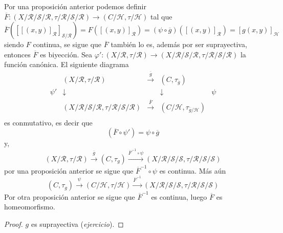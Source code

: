 \documentclass[12pt]{report}
\theoremstyle{largebreak}
\newcommand\cf[3]{\ensuremath{#1:#2\rightarrow#3}}
\begin{document}
\begin{exa}
        Por una proposición anterior podemos definir $\cf{\overline{F}}{(X/\mathcal{R}/\mathcal{S}/\mathcal{R},\tau/\mathcal{R}/\mathcal{S}/\mathcal{R})}{(C/\mathcal{H},\tau/\mathcal{H})}$ tal que
        \begin{equation*}
            \overline{F}\left(\left[\left[(x,y) \right]_{\mathcal{R}} \right]_{\mathcal{S}/\mathcal{R}} \right)=F\left([(x,y)]_{\mathcal{R}}\right)=(\psi\circ\overline{g})([(x,y)]_{\mathcal{R}})=[g(x,y)]_{\mathcal{H}}
        \end{equation*}
        siendo $F$ continua, se sigue que $\overline{F}$ también lo es, además por ser suprayectiva, entonces $\overline{F}$ es biyección. Sea $\cf{\varphi'}{(X/\mathcal{R},\tau/\mathcal{R})}{(X/\mathcal{R}/\mathcal{S}/\mathcal{R},\tau/\mathcal{R}/\mathcal{S}/\mathcal{R})}$ la función canónica. El siguiente diagrama
        \begin{equation*}
            \begin{array}{lcccr}
                & (X/\mathcal{R},\tau/\mathcal{R})& \overset{\overline{g}}{\longrightarrow} & (C,\tau_{\overline{g}}) & \\
                \psi' & \downarrow & & \downarrow & \psi\\
                & (X/\mathcal{R}/\mathcal{S}/\mathcal{R},\tau/\mathcal{R}/\mathcal{S}/\mathcal{R})& \overset{\overline{F}}{\longrightarrow} & (C/\mathcal{H},\tau_{\overline{g}/\mathcal{H}}) & \\
            \end{array}
        \end{equation*}
        es conmutativo, es decir que
        \begin{equation*}
            (\overline{F}\circ\psi')=\psi\circ\overline{g}
        \end{equation*}
        y,
        \begin{equation*}
            (X/\mathcal{R},\tau/\mathcal{R})\overset{\overline{g}}{\longrightarrow}(C,\tau_g)\overset{\overline{F}^{-1}\circ\psi}{\longrightarrow}(X/\mathcal{R}/\mathcal{S}/\mathcal{S},\tau/\mathcal{R}/\mathcal{S}/\mathcal{S})
        \end{equation*}
        por una proposición anterior se sigue que $\overline{F}^{-1}\circ\psi$ es continua. Más aún
        \begin{equation*}
            (C,\tau_g)\overset{\psi}{\longrightarrow}(C/\mathcal{H},\tau/\mathcal{H})\overset{\overline{F}^{-1}}{\longrightarrow}(X/\mathcal{R}/\mathcal{S}/\mathcal{S},\tau/\mathcal{R}/\mathcal{S}/\mathcal{S})
        \end{equation*}
        Por otra proposición anterior se sigue que $\overline{F}^{-1}$ es continua, luego $\overline{F}$ es homeomorfismo.
    \end{exa}

    \begin{proof}
        $g$ es suprayectiva (\textit{ejercicio}).
    \end{proof}
\end{document}
